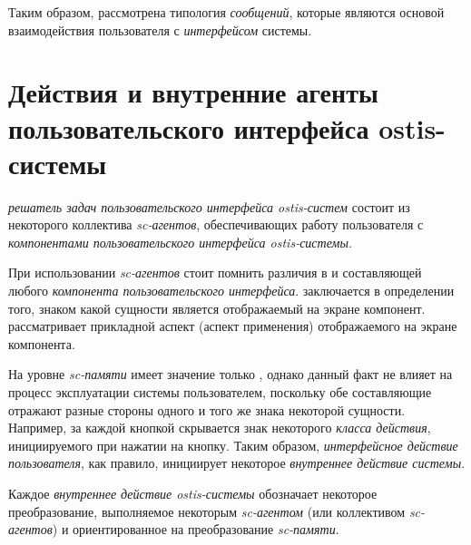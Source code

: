 Таким образом, рассмотрена типология \textit{сообщений}, которые являются основой взаимодействия пользователя с \textit{интерфейсом} системы.

\section{Действия и внутренние агенты пользовательского интерфейса ostis-системы}
\label{sec_interfaces_actions_and_agents}

\textit{решатель задач пользовательского интерфейса ostis-систем} состоит из некоторого коллектива \textit{sc-агентов}, обеспечивающих работу пользователя с \textit{компонентами пользовательского интерфейса ostis-системы}.

При использовании \textit{sc-агентов} стоит помнить различия в  и  составляющей любого \textit{компонента пользовательского интерфейса}.  заключается в определении того, знаком какой сущности является отображаемый на экране компонент.  рассматривает прикладной аспект (аспект применения) отображаемого на экране компонента.

На уровне \textit{sc-памяти} имеет значение только , однако данный факт не влияет на процесс эксплуатации системы пользователем, поскольку обе составляющие отражают разные стороны одного и того же знака некоторой сущности. Например, за каждой кнопкой скрывается знак некоторого \textit{класса действия}, инициируемого при нажатии на кнопку. Таким образом, \textit{интерфейсное действие пользователя}, как правило, инициирует некоторое \textit{внутреннее действие системы}. 

\begin{SCn}



\end{SCn}
	
Каждое \textit{внутреннее действие ostis-системы} обозначает некоторое преобразование, выполняемое некоторым \textit{sc-агентом} (или коллективом \textit{sc-агентов}) и ориентированное на преобразование \textit{sc-памяти}.

\begin{SCn}


\end{SCn}

